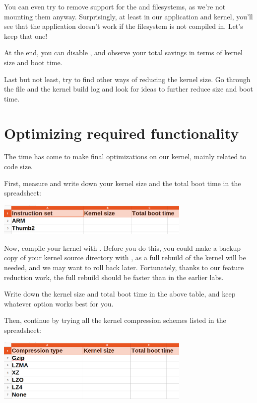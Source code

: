You can even try to remove support for the  and 
filesystems, as we're not mounting them anyway. Surprisingly, at least
in our application and kernel, you'll see that the application doesn't
work if the  filesystem is not compiled in. Let's keep that
one!

At the end, you can disable , and observe your
total savings in terms of kernel size and boot time.

Last but not least, try to find other ways of reducing the kernel size.
Go through the  file and the kernel build log and look for
ideas to further reduce size and boot time.

\section{Optimizing required functionality}

The time has come to make final optimizations on our kernel, mainly
related to code size.

First, measure and write down your kernel size and the total boot time
in the  spreadsheet:

\includegraphics[width=0.7\textwidth]{labs/boot-time-kernel/kernel-size-arm-thumb2.png}

Now, compile your kernel with . Before you do
this, you could make a backup copy of your kernel source directory with
, as a full rebuild of the kernel will be needed, and we
may want to roll back later. Fortunately, thanks to our feature
reduction work, the full rebuild should be faster than in the earlier labs.

Write down the kernel size and total boot time in the above table,
and keep whatever option works best for you.

Then, continue by trying all the kernel compression schemes listed in
the  spreadsheet:

\includegraphics[width=0.7\textwidth]{labs/boot-time-kernel/kernel-size-compression.png}

